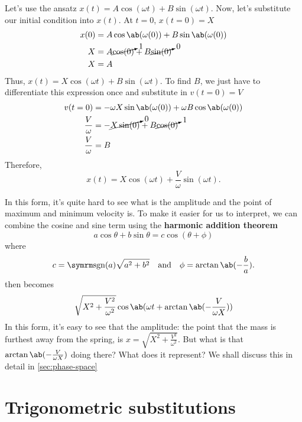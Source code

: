 Let's use the ansatz \(x(t) = A\cos(\omega t) + B\sin(\omega t)\). Now, let's substitute our initial condition into \(x(t)\). At \(t = 0\), \(x(t = 0) = X\)
\begin{align}
  x(0) & = A\cos\ab(\omega(0)) + B\sin\ab(\omega(0))       \\
  X    & = A\cancelto{1}{\cos(0)} + B\cancelto{0}{\sin(0)} \\
  X    & = A
\end{align}
Thus, \(x(t) = X\cos(\omega t) + B\sin(\omega t)\). To find \(B\), we just have to differentiate this expression once and substitute in \(v(t = 0) = V\)
\begin{align}
  v(t = 0)         & = -\omega X\sin\ab(\omega (0)) + \omega B\cos\ab(\omega (0)) \\
  \frac{V}{\omega} & = - \cancelto{0}{X\sin(0)} + B\cancelto{1}{\cos(0)}          \\
  \frac{V}{\omega} & = B
\end{align}
Therefore,
\begin{equation}
  x(t) = X\cos(\omega t) + \frac{V}{\omega}\sin(\omega t). \label{eq:harmonic-oscillator-other-solutions-0}
\end{equation}

In this form, it's quite hard to see what is the amplitude and the point of maximum and minimum velocity is. To make it easier for us to interpret, we can combine the cosine and sine term using the \textbf{harmonic addition theorem}
\begin{equation}
  a\cos\theta + b\sin\theta = c\cos(\theta + \phi)
\end{equation}
where
\begin{gather}
  c = \sgn(a)\sqrt{a^2 + b^2} \mathand \phi = \arctan\ab(-\frac{b}{a}).
\end{gather}
 then becomes
\begin{equation}
  \sqrt{X^2 + \frac{V^2}{\omega^2}}\cos\ab(\omega t + \arctan\ab(-\frac{V}{\omega X}))
\end{equation}
In this form, it's easy to see that the amplitude: the point that the mass is furthest away from the spring, is \(x = \sqrt{X^2 + \frac{V^2}{\omega^2}}\). But what is that \(\arctan\ab(-\frac{V}{\omega X})\) doing there? What does it represent? We shall discuss this in detail in \cref{sec:phase-space}

\section{Trigonometric substitutions}
\label{sec:trigonometric_substitution}

